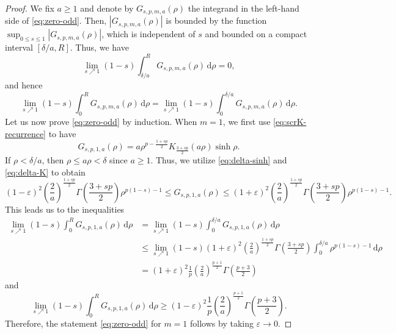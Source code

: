 \documentclass[10pt,a4paper]{amsart}
\begin{document}
\begin{proof}
We fix $a \geq 1$ and denote by $G_{s, p, m, a}(\rho)$ the integrand in the left-hand side of \eqref{eq:zero-odd}. Then, $|G_{s, p, m, a}(\rho)|$ is bounded by the function $\sup_{0 \leq s \leq 1} |G_{s, p, m, a}(\rho)|$, which is independent of $s$ and bounded on a compact interval $[\delta/a, R]$. Thus, we have
\begin{equation*}
\lim_{s \nearrow 1} (1-s) \int_{\delta/a}^{R} G_{s, p, m, a}(\rho) \, \mathrm{d}\rho = 0,
\end{equation*}
and hence
\begin{equation*}
\lim_{s \nearrow 1} (1-s) \int_{0}^{R} G_{s, p, m, a}(\rho) \, \mathrm{d}\rho = \lim_{s \nearrow 1} (1-s) \int_{0}^{\delta/a} G_{s, p, m, a}(\rho) \, \mathrm{d}\rho.
\end{equation*}
Let us now prove \eqref{eq:zero-odd} by induction. When $m=1$, we first use \eqref{eq:scrK-recurrence} to have
\begin{equation*}
G_{s, p, 1, a}(\rho) = a\rho^{p-\frac{1+sp}{2}} K_{\frac{3+sp}{2}}(a\rho) \sinh \rho.
\end{equation*}
If $\rho < \delta/a$, then $\rho \leq a\rho < \delta$ since $a \geq 1$. Thus, we utilize \eqref{eq:delta-sinh} and \eqref{eq:delta-K} to obtain
\begin{equation*}
(1-\varepsilon)^2 \left( \frac{2}{a} \right)^{\frac{1+sp}{2}} \Gamma\left( \frac{3+sp}{2} \right) \rho^{p(1-s)-1} \leq G_{s, p, 1, a}(\rho) \leq (1+\varepsilon)^2 \left( \frac{2}{a} \right)^{\frac{1+sp}{2}} \Gamma\left( \frac{3+sp}{2} \right) \rho^{p(1-s)-1}.
\end{equation*}
This leads us to the inequalities
\begin{equation*}
\begin{split}
\lim_{s \nearrow 1} (1-s) \int_{0}^{R} G_{s, p, 1, a}(\rho) \, \mathrm{d}\rho
&= \lim_{s \nearrow 1} (1-s) \int_{0}^{\delta/a} G_{s, p, 1, a}(\rho) \, \mathrm{d}\rho \\
&\leq \lim_{s \nearrow 1} (1-s) (1+\varepsilon)^2 \left( \frac{2}{a} \right)^{\frac{1+sp}{2}} \Gamma\left( \frac{3+sp}{2} \right) \int_{0}^{\delta/a} \rho^{p(1-s)-1} \, \mathrm{d}\rho \\
&= (1+\varepsilon)^2 \frac{1}{p} \left( \frac{2}{a} \right)^{\frac{p+1}{2}} \Gamma\left( \frac{p+3}{2} \right)
\end{split}
\end{equation*}
and
\begin{equation*}
\lim_{s \nearrow 1} (1-s) \int_{0}^{R} G_{s, p, 1, a}(\rho) \, \mathrm{d}\rho \geq (1-\varepsilon)^{2} \frac{1}{p} \left( \frac{2}{a} \right)^{\frac{p+1}{2}} \Gamma\left( \frac{p+3}{2} \right).
\end{equation*}
Therefore, the statement \eqref{eq:zero-odd} for $m=1$ follows by taking $\varepsilon \to 0$.


\end{proof}
\end{document}
